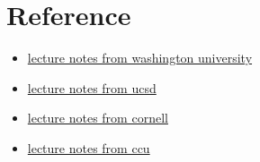 \section{Reference}
\begin{itemize}
    \item \href{https://sites.math.washington.edu/~burke/crs/408/notes/nlp/direction.pdf}{lecture notes from washington university}
    \item \href{https://math.ucsd.edu/sites/math.ucsd.edu/files/undergrad/honors-program/honors-theses/2019-2020/Jeb_Runnoe_Honors_Thesis.pdf}{lecture notes from ucsd}
    \item \href{https://www.stat.cmu.edu/~ryantibs/convexopt-F18/lectures/quasi-newton.pdf}{lecture notes from cornell}
    \item \href{https://www.cs.ccu.edu.tw/~wtchu/courses/2014s_OPT/Lectures/Chapter%2011%20Quasi-Newton%20Methods.pdf}{lecture notes from ccu}
\end{itemize}